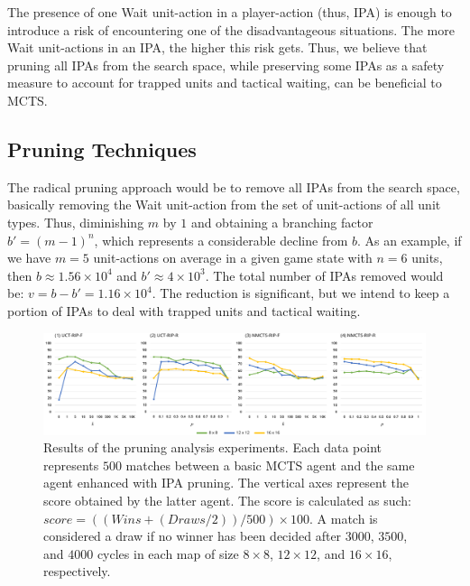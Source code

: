 \documentclass[conference]{IEEEtran}
\newcommand{\squeezeup}{\vspace{-2.0mm}}
\begin{document}
The presence of one Wait unit-action in a player-action (thus, IPA) is enough to introduce a risk of encountering one of the disadvantageous situations. The more Wait unit-actions in an IPA, the higher this risk gets. Thus, we believe that pruning all IPAs from the search space, while preserving some IPAs as a safety measure to account for trapped units and tactical waiting, can be beneficial to MCTS.



\subsection{Pruning Techniques}

The radical pruning approach would be to remove all IPAs from the search space, basically removing the Wait unit-action from the set of unit-actions of all unit types. Thus, diminishing $m$ by $1$ and obtaining a branching factor $b' = (m - 1)^n$, which represents a considerable decline from $b$. As an example, if we have $m=5$ unit-actions on average in a given game state with $n=6$ units, then $b \approx 1.56\times10^4$ and $b' \approx 4\times10^3$. The total number of IPAs removed would be: $v = b - b' = 1.16\times10^4$. The reduction is significant, but we intend to keep a portion of IPAs to deal with trapped units and tactical waiting.

\begin{figure}[!h]
\begin{center}
	\includegraphics[width=1\textwidth]{figs/PT-h.pdf}
	\caption{Results of the pruning analysis experiments. Each data point represents $500$ matches between a basic MCTS agent and the same agent enhanced with IPA pruning. The vertical axes represent the score obtained by the latter agent. The score is calculated as such: $score = ((Wins + (Draws / 2)) / 500) \times 100$. A match is considered a draw if no winner has been decided after $3000$, $3500$, and $4000$ cycles in each map of size $8\times8$, $12\times12$, and $16\times16$, respectively.}
	\label{PruningAnalysis}
\end{center}
\squeezeup 
\end{figure}
\end{document}
